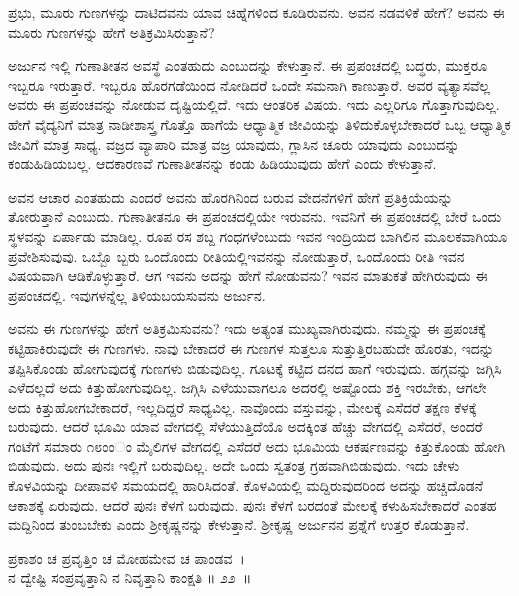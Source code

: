 \begin{artha}
ಪ್ರಭು, ಮೂರು ಗುಣಗಳನ್ನು ದಾಟಿದವನು ಯಾವ ಚಿಹ್ನೆಗಳಿಂದ ಕೂಡಿರುವನು. ಅವನ ನಡವಳಿಕೆ ಹೇಗೆ? ಅವನು ಈ ಮೂರು ಗುಣಗಳನ್ನು ಹೇಗೆ ಅತಿಕ್ರಮಿಸಿರುತ್ತಾನೆ?
\end{artha}

ಅರ್ಜುನ ಇಲ್ಲಿ ಗುಣಾತೀತನ ಅವಸ್ಥೆ ಎಂತಹುದು ಎಂಬುದನ್ನು ಕೇಳುತ್ತಾನೆ. ಈ ಪ್ರಪಂಚದಲ್ಲಿ ಬದ್ಧರು, ಮುಕ್ತರೂ ಇಬ್ಬರೂ ಇರುತ್ತಾರೆ. ಇಬ್ಬರೂ ಹೊರಗಡೆಯಿಂದ ನೋಡಿದರೆ ಒಂದೇ ಸಮನಾಗಿ ಕಾಣುತ್ತಾರೆ. ಅವರ ವ್ಯತ್ಯಾಸವೆಲ್ಲ ಅವರು ಈ ಪ್ರಪಂಚವನ್ನು ನೋಡುವ ದೃಷ್ಟಿಯಲ್ಲಿದೆ. ಇದು ಆಂತರಿಕ ವಿಷಯ. ಇದು ಎಲ್ಲರಿಗೂ ಗೊತ್ತಾಗುವುದಿಲ್ಲ. ಹೇಗೆ ವೈದ್ಯನಿಗೆ ಮಾತ್ರ ನಾಡೀಶಾಸ್ತ್ರ ಗೊತ್ತೊ ಹಾಗೆಯೆ ಆಧ್ಯಾತ್ಮಿಕ ಜೀವಿಯನ್ನು ತಿಳಿದುಕೊಳ್ಳಬೇಕಾದರೆ ಒಬ್ಬ ಆಧ್ಯಾತ್ಮಿಕ ಜೀವಿಗೆ ಮಾತ್ರ ಸಾಧ್ಯ. ವಜ್ರದ ವ್ಯಾಪಾರಿ ಮಾತ್ರ ವಜ್ರ ಯಾವುದು, ಗ್ಲಾಸಿನ ಚೂರು ಯಾವುದು ಎಂಬುದನ್ನು ಕಂಡುಹಿಡಿಯಬಲ್ಲ. ಆದಕಾರಣವೆ ಗುಣಾತೀತನನ್ನು ಕಂಡು ಹಿಡಿಯುವುದು ಹೇಗೆ ಎಂದು ಕೇಳುತ್ತಾನೆ.

ಅವನ ಆಚಾರ ಎಂತಹುದು ಎಂದರೆ ಅವನು ಹೊರಗಿನಿಂದ ಬರುವ ವೇದನೆಗಳಿಗೆ ಹೇಗೆ ಪ್ರತಿಕ್ರಿಯೆಯನ್ನು ತೋರುತ್ತಾನೆ ಎಂಬುದು. ಗುಣಾತೀತನೂ ಈ ಪ್ರಪಂಚದಲ್ಲಿಯೇ ಇರುವನು. ಇವನಿಗೆ ಈ ಪ್ರಪಂಚದಲ್ಲಿ ಬೇರೆ ಒಂದು ಸ್ಥಳವನ್ನು ಏರ್ಪಾಡು ಮಾಡಿಲ್ಲ. ರೂಪ ರಸ ಶಬ್ದ ಗಂಧಗಳೆಂಬುದು ಇವನ ಇಂದ್ರಿಯದ ಬಾಗಿಲಿನ ಮೂಲಕವಾಗಿಯೂ ಪ್ರವೇಶಿಸುವುವು. ಒಬ್ಬೊ ಬ್ಬರು ಒಂದೊಂದು ರೀತಿಯಲ್ಲಿಇವನನ್ನು ನೋಡುತ್ತಾರೆ, ಒಂದೊಂದು ರೀತಿ ಇವನ ವಿಷಯವಾಗಿ ಆಡಿಕೊಳ್ಳುತ್ತಾರೆ. ಆಗ ಇವನು ಅದನ್ನು ಹೇಗೆ ನೋಡುವನು? ಇವನ ಮಾತುಕತೆ ಹೇಗಿರುವುದು ಈ ಪ್ರಪಂಚದಲ್ಲಿ. ಇವುಗಳನ್ನೆಲ್ಲ ತಿಳಿಯಬಯಸುವನು ಅರ್ಜುನ.

ಅವನು ಈ ಗುಣಗಳನ್ನು ಹೇಗೆ ಅತಿಕ್ರಮಿಸುವನು? ಇದು ಅತ್ಯಂತ ಮುಖ್ಯವಾಗಿರುವುದು. ನಮ್ಮನ್ನು ಈ ಪ್ರಪಂಚಕ್ಕೆ ಕಟ್ಟಿಹಾಕಿರುವುದೇ ಈ ಗುಣಗಳು. ನಾವು ಬೇಕಾದರೆ ಈ ಗುಣಗಳ ಸುತ್ತಲೂ ಸುತ್ತುತ್ತಿರಬಹುದೇ ಹೊರತು, ಇದನ್ನು ತಪ್ಪಿಸಿಕೊಂಡು ಹೋಗುವುದಕ್ಕೆ ಗುಣಗಳು ಬಿಡುವುದಿಲ್ಲ. ಗೂಟಕ್ಕೆ ಕಟ್ಟಿದ ದನದ ಹಾಗೆ ಇರುವುದು. ಹಗ್ಗವನ್ನು ಜಗ್ಗಿಸಿ ಎಳೆದಲ್ಲದೆ ಅದು ಕಿತ್ತುಹೋಗುವುದಿಲ್ಲ. ಜಗ್ಗಿಸಿ ಎಳೆಯುವಾಗಲೂ ಅದರಲ್ಲಿ ಅಷ್ಟೊಂದು ಶಕ್ತಿ ಇರಬೇಕು, ಆಗಲೇ ಅದು ಕಿತ್ತುಹೋಗಬೇಕಾದರೆ, ಇಲ್ಲದಿದ್ದರೆ ಸಾಧ್ಯವಿಲ್ಲ. ನಾವೊಂದು ವಸ್ತುವನ್ನು, ಮೇಲಕ್ಕೆ ಎಸೆದರೆ ತಕ್ಷಣ ಕೆಳಕ್ಕೆ ಬರುವುದು. ಆದರೆ ಭೂಮಿ ಯಾವ ವೇಗದಲ್ಲಿ ಸೆಳೆಯುತ್ತಿದೆಯೊ ಅದಕ್ಕಿಂತ ಹೆಚ್ಚು ವೇಗದಲ್ಲಿ ಎಸೆದರೆ, ಅಂದರೆ ಗಂಟೆಗೆ ಸಮಾರು ೧೮ಂಂಂ ಮೈಲಿಗಳ ವೇಗದಲ್ಲಿ ಎಸೆದರೆ ಅದು ಭೂಮಿಯ ಆಕರ್ಷಣವನ್ನು ಕಿತ್ತುಕೊಂಡು ಹೋಗಿ ಬಿಡುವುದು. ಅದು ಪುನಃ ಇಲ್ಲಿಗೆ ಬರುವುದಿಲ್ಲ. ಅದೇ ಒಂದು ಸ್ವತಂತ್ರ ಗ್ರಹವಾಗಿಬಿಡುವುದು. ಇದು ಚೇಳು ಕೊಳವಿಯನ್ನು ದೀಪಾವಳಿ ಸಮಯದಲ್ಲಿ ಹಾರಿಸಿದಂತೆ. ಕೊಳವಿಯಲ್ಲಿ ಮದ್ದಿರುವುದರಿಂದ ಅದನ್ನು ಹಚ್ಚಿದೊಡನೆ ಆಕಾಶಕ್ಕೆ ಏರುವುದು. ಆದರೆ ಪುನಃ ಕೆಳಗೆ ಬರುವುದು. ಪುನಃ ಕೆಳಗೆ ಬರದಂತೆ ಮೇಲಕ್ಕೆ ಕಳುಹಿಸಬೇಕಾದರೆ ಎಂತಹ ಮದ್ದಿನಿಂದ ತುಂಬಬೇಕು ಎಂದು ಶ‍್ರೀಕೃಷ್ಣನನ್ನು ಕೇಳುತ್ತಾನೆ. ಶ‍್ರೀಕೃಷ್ಣ ಅರ್ಜುನನ ಪ್ರಶ್ನೆಗೆ ಉತ್ತರ ಕೊಡುತ್ತಾನೆ.

\begin{shloka}
ಪ್ರಕಾಶಂ ಚ ಪ್ರವೃತ್ತಿಂ ಚ ಮೋಹಮೇವ ಚ ಪಾಂಡವ~।\\ನ ದ್ವೇಷ್ಟಿ ಸಂಪ್ರವೃತ್ತಾನಿ ನ ನಿವೃತ್ತಾನಿ ಕಾಂಕ್ಷತಿ \hfill॥ ೨೨~॥
\end{shloka}

